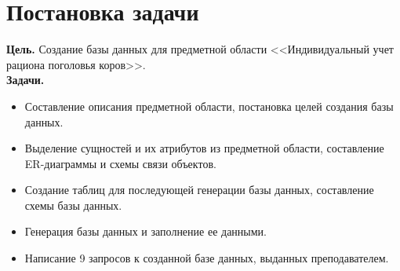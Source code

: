 

\section{Постановка задачи}
\textbf{Цель.}
Создание базы данных для предметной области <<Индивидуальный учет рациона поголовья коров>>.\\

\textbf{Задачи.}
\begin{itemize}
    \item Составление описания предметной области, постановка целей создания базы данных.
    \item Выделение сущностей и их атрибутов из предметной области, составление ER-диаграммы и схемы связи объектов.
    \item Создание таблиц для последующей генерации базы данных, составление схемы базы данных.
    \item Генерация базы данных и заполнение ее данными.
    \item Написание 9 запросов к созданной базе данных, выданных преподавателем.
\end{itemize}